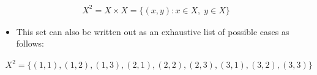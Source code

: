 \documentclass[letterpaper,10pt,english]{jupyterBook}
\begin{document}
\begin{equation*}
\begin{split}X^2 = X \times X = \{(x, y) : x \in X , \; y \in X \}\end{split}
\end{equation*}\begin{itemize}
\item {} 
\sphinxAtStartPar
This set can also be written out as an exhaustive list of possible cases as follows:

\end{itemize}
\begin{equation*}
\begin{split}X^2 = \{(1, 1) , (1, 2) , (1, 3) , (2, 1), (2, 2) , (2, 3) , (3, 1) , (3, 2) , (3, 3)\}\end{split}
\end{equation*}
\end{document}
